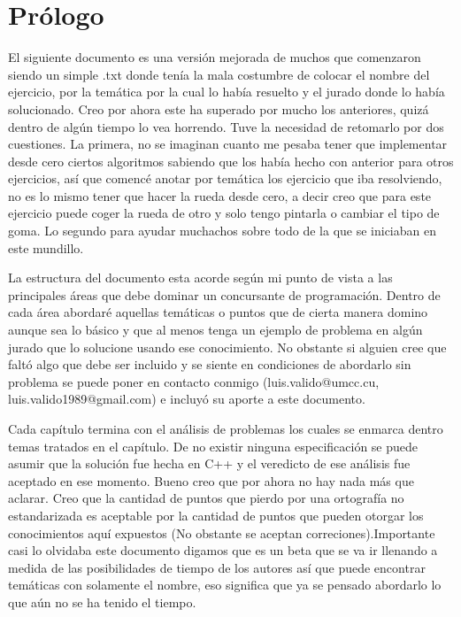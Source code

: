\pagestyle{fancy}
\lhead{}
\chead{}
\chapter*{Prólogo}
El siguiente documento es una versión mejorada de muchos que comenzaron siendo un simple .txt donde tenía la mala costumbre de colocar el nombre del ejercicio, por la temática por la cual lo había resuelto y el jurado donde lo había solucionado. Creo por ahora este ha superado por mucho los anteriores, quizá dentro de algún tiempo lo vea horrendo. Tuve la necesidad de retomarlo por dos cuestiones. La primera, no se imaginan cuanto me pesaba tener que
implementar desde cero ciertos algoritmos sabiendo que los había hecho con anterior para otros ejercicios, así que comencé anotar por temática los ejercicio que iba resolviendo, no es lo mismo tener que hacer la rueda desde cero, a decir creo que para este ejercicio puede coger la rueda de otro y solo tengo pintarla o cambiar el tipo de goma. Lo segundo para ayudar muchachos sobre todo de la  que se iniciaban en este mundillo.

La estructura del documento esta acorde según mi punto de vista a las principales áreas que debe dominar un concursante de programación. Dentro de cada área abordaré aquellas temáticas o puntos que de cierta manera domino aunque sea lo básico y que al menos tenga un ejemplo de problema en algún jurado que lo solucione usando ese conocimiento. No obstante si alguien cree que faltó algo que debe ser incluido y se siente en condiciones de abordarlo sin problema se puede poner en contacto conmigo (luis.valido@umcc.cu, luis.valido1989@gmail.com) e incluyó su aporte a este documento.  

Cada capítulo termina con el análisis de problemas los cuales se enmarca dentro temas tratados en el capítulo. De no existir ninguna especificación se puede asumir que la solución fue hecha en C++ y el veredicto de ese análisis fue aceptado en ese momento. Bueno creo que por ahora no hay nada más que aclarar. Creo que la cantidad de puntos que pierdo por una ortografía no estandarizada es aceptable por la cantidad de puntos que pueden otorgar los conocimientos aquí expuestos (No obstante se aceptan correciones).Importante casi lo olvidaba este documento digamos que es un beta que se va ir llenando a medida de las posibilidades de tiempo de los autores así que puede encontrar temáticas con solamente el nombre, eso significa que ya se pensado abordarlo lo que aún no se ha tenido el tiempo.



